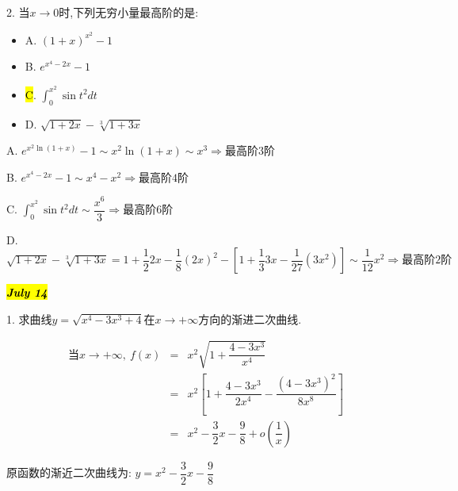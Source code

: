 2. 当$x\rightarrow 0$时,下列无穷小量最高阶的是: 
\begin{itemize}
	\item A. $(1+x)^{x^2}-1$
	\item B. $e^{x^4-2x}-1$
	\item \hl{C}. $\int_{0}^{x^2}\sin t^2dt$
	\item D. $\sqrt{1+2x}-\sqrt[3]{1+3x}$
\end{itemize}
\begin{solution}
	
	A. $e^{x^2\ln(1+x)}-1\sim x^2\ln(1+x)\sim x^3\Rightarrow \text{最高阶} 3\text{阶}$
	
	B. $e^{x^4-2x}-1\sim x^4-x^2\Rightarrow \text{最高阶} 4\text{阶}$
	
	C. $\int_{0}^{x^2}\sin t^2dt\sim \dfrac{x^6}{3}\Rightarrow \text{最高阶} 6\text{阶}$
	
	D. $\sqrt{1+2x}-\sqrt[3]{1+3x}=1+\dfrac{1}{2}2x-\dfrac{1}{8}(2x)^2-[1+\dfrac{1}{3}3x-\dfrac{1}{27}(3x^2)]\sim \dfrac{1}{12}x^2\Rightarrow \text{最高阶} 2\text{阶}$
\end{solution}

\hl{\textbf{\textit{July 14}}}

1. 求曲线$y=\sqrt{x^4-3x^3+4}$在$x\rightarrow +\infty$方向的渐进二次曲线.
\begin{solution}
	\begin{eqnarray*}
		\text{当}x\rightarrow +\infty,\ f(x)&=&x^2\sqrt{1+\dfrac{4-3x^3}{x^4}}\\
		&=&x^2[1+\dfrac{4-3x^3}{2x^4}-\dfrac{(4-3x^3)^2}{8x^8}]\\
		&=&x^2-\dfrac{3}{2}x-\dfrac{9}{8}+o(\dfrac{1}{x})
	\end{eqnarray*}
	
	原函数的渐近二次曲线为: $y=x^2-\dfrac{3}{2}x-\dfrac{9}{8}$
\end{solution}

